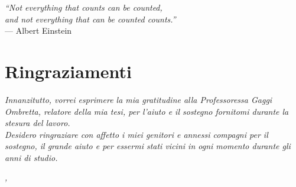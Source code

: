 
\cleardoublepage
{}
{}

\begin{flushright}{
	\slshape    
	``Not everything that counts can be counted, \\and not everything that can be counted counts.''} \\ 
	\medskip
    --- Albert Einstein
\end{flushright}


\bigskip

\begingroup
\let\clearpage\relax
\let\cleardoublepage\relax

\chapter*{Ringraziamenti}

\noindent \textit{Innanzitutto, vorrei esprimere la mia gratitudine alla Professoressa Gaggi Ombretta, relatore della mia tesi, per l'aiuto e il sostegno fornitomi durante la stesura del lavoro.}\\

\noindent \textit{Desidero ringraziare con affetto i miei genitori e annessi compagni per il sostegno, il grande aiuto e per essermi stati vicini in ogni momento durante gli anni di studio.}\\

\bigskip

\noindent\textit{\myLocation, \myTime}
\hfill \myName

\endgroup

